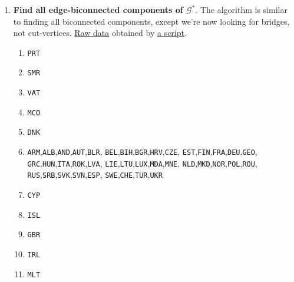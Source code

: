 \documentclass[12pt, a4paper]{article}
\newcommand\EGraph{\mathcal{G}^{*}}
\begin{document}
\begin{enumerate}[label=\alph*)]
\begin{figure}
\caption{Block-cut tree}\label{fig:block-cut-tree}
\end{figure}

The block-cut tree is shown in \cref{fig:block-cut-tree}.

\item \textbf{Find all edge-biconnected components of \(\EGraph\)}.
The algorithm is similar to finding all biconnected components, except we're
now looking for bridges, not cut-vertices.
\href{https://github.com/ablearthy-itmo-39828cf299f04949c86/discrete-math-2-hw-1/blob/1a4ed14/data/edge_biconnected_components.txt}{Raw data}
obtained by
\href{https://github.com/ablearthy-itmo-39828cf299f04949c86/discrete-math-2-hw-1/blob/7121231/auto/edges_biconnected_components.py}{a script}.

\begin{enumerate}
\item \texttt{PRT}
\item \texttt{SMR}
\item \texttt{VAT}
\item \texttt{MCO}
\item \texttt{DNK}
\item \texttt{ARM},\texttt{ALB},\texttt{AND},\texttt{AUT},\texttt{BLR},
      \texttt{BEL},\texttt{BIH},\texttt{BGR},\texttt{HRV},\texttt{CZE},
      \texttt{EST},\texttt{FIN},\texttt{FRA},\texttt{DEU},\texttt{GEO},
      \texttt{GRC},\texttt{HUN},\texttt{ITA},\texttt{ROK},\texttt{LVA},
      \texttt{LIE},\texttt{LTU},\texttt{LUX},\texttt{MDA},\texttt{MNE},
      \texttt{NLD},\texttt{MKD},\texttt{NOR},\texttt{POL},\texttt{ROU},
      \texttt{RUS},\texttt{SRB},\texttt{SVK},\texttt{SVN},\texttt{ESP},
      \texttt{SWE},\texttt{CHE},\texttt{TUR},\texttt{UKR}
\item \texttt{CYP}
\item \texttt{ISL}
\item \texttt{GBR}
\item \texttt{IRL}
\item \texttt{MLT}
\end{enumerate}


\end{enumerate}
\end{document}
